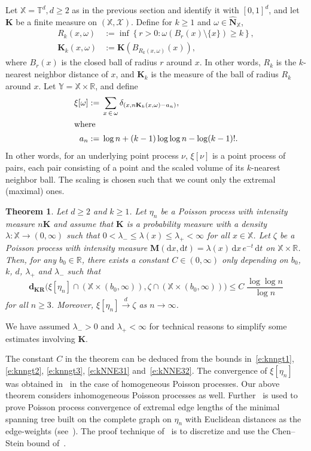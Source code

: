 \documentclass[10pt]{amsart}
\newtheorem{theo}{Theorem}[section]
\theoremstyle{definition}\newtheorem{defi}[theo]{Definition}\newtheorem{rema}[theo]{Remark}\newtheorem{exam}[theo]{Example}\newtheorem{exem}[theo]{Example}\newtheorem{nota}[theo]{Notation}
\newcommand*\bM{\mathbf{M}}
\newcommand*\bN{\mathbf{N}}
\newcommand*\bK{\mathbf{K}}
\newcommand*\dkr{\mathbf{d_{KR}}}
\newcommand*\R{\mathbb{R}}
\newcommand*\T{\mathbb{T}}
\newcommand*\X{\mathbb{X}}
\newcommand*\Y{\mathbb{Y}}
\newcommand*\cX{\mathcal{X}}
\newcommand*\md{\mathrm{d}}
\begin{document}
Let $\X = \T^d, d \geq 2$ as in the previous section and identify it with $[0,1]^d$, and let $\bK$ be a finite measure on $(\X,\cX)$. Define for $k\ge 1$ and $\omega \in \widehat{\bN}_{\X}$,
\begin{align*}
R_k(x,\omega) &:= \inf \left\{r > 0 : \omega\left(B_r(x) \setminus \{x\}\right) {\geq} k \right\},\\
\bK_k(x,\omega) &:= \bK\left(B_{R_k(x,\omega)}(x)\right),
\end{align*}
where $B_r(x)$ is the {closed} ball of radius $r$ around $x$. In other words, $R_k$ is the $k$-nearest neighbor distance of $x$, and $\bK_k$ is the measure of the ball of radius $R_k$ around $x$. Let $\Y = \X\times \R$, and define
\begin{align}
\xi[\omega] :=& \;\sum_{x\,\in\,\omega} \delta_{\left(x, n\bK_k(x,\omega) - a_n\right)},\nonumber
\\
\intertext{where}
a_n :=& \;\log n + (k-1)\log \log n - \log (k-1)!.\label{e:a_n}
\end{align}
In other words, {for an underlying point process $\nu$, $\xi[\nu]$} is a point process of pairs, each pair consisting of a point and the scaled volume of its $k$-nearest neighbor ball. The scaling is chosen such that we count only the extremal (maximal) ones.

\begin{theo}\label{t:knnapprox}
Let $d \geq 2$ and $k \geq 1$. Let $\eta_n$ be a Poisson process with intensity measure $n\bK$ and assume that $\bK$ is a probability measure with a density $\lambda : \X \to (0,\infty)$ such that $0 < \lambda_- \le \lambda(x) \le \lambda_+ < \infty$ for all $x\in \X$. Let $\zeta$ be a Poisson process with intensity measure $\bM(\md x,\md t) = \lambda(x) \, \md x \, e^{-t} \, \md t$ on $\X \times \R$. Then, for any $b_0 \in \R$, there exists a constant $C\in(0,\infty)$ only depending on $b_0$, $k$, $d$, $\lambda_+$ and $\lambda_-$ such that
\begin{equation}\label{e:knnbd}
\dkr\big(\xi[\eta_n] \cap \left(\X \times (b_0,\infty)\right),\zeta \cap \left(\X \times (b_0,\infty)\right)\big) \leq C\;\frac{\log \log n}{\log n}
\end{equation}
for all $n\geq 3$. Moreover, $\xi[\eta_n] \stackrel{d}{\to} \zeta$ as $n \to \infty$.
\end{theo}


We have assumed $\lambda_->0$ and $\lambda_+ < \infty$ for technical reasons to simplify some estimates involving $\bK$.

The constant $C$ in the theorem can be deduced from the bounds in~\eqref{e:knngt1}, \eqref{e:knngt2}, \eqref{e:knngt3}, \eqref{e:kNNE31} and~\eqref{e:kNNE32}. The convergence of $\xi[\eta_n]$ was obtained in~\cite[Theorem~2]{Penrose1997} in the case of homogeneous Poisson processes. Our above theorem considers inhomogeneous Poisson processes as well. Further~\cite[Theorem~2]{Penrose1997} is used to prove Poisson process convergence of extremal edge lengths of the minimal spanning tree built on the complete graph on $\eta_n$ with Euclidean distances as the edge-weights (see~\cite[Theorem~3]{Penrose1997}). The proof technique of~\cite[Theorem~2]{Penrose1997} is to discretize and use the Chen--Stein bound of~\cite{Arratia1989}.
\end{document}
